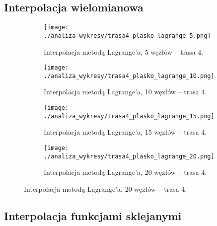 \documentclass[a4paper,12pt]{article}
\begin{document}
\subsection{Interpolacja wielomianowa}
\begin{figure}[H]
    \centering
    \begin{subfigure}{0.45\textwidth}
        \centering
        \texttt{[image: ./analiza\_wykresy/trasa4\_plasko\_lagrange\_5.png]}
        \caption{Interpolacja metodą Lagrange’a, 5 węzłów – trasa 4.}
    \end{subfigure}\hfill
    \begin{subfigure}{0.45\textwidth}
        \centering
        \texttt{[image: ./analiza\_wykresy/trasa4\_plasko\_lagrange\_10.png]}
        \caption{Interpolacja metodą Lagrange’a, 10 węzłów – trasa 4.}
    \end{subfigure}
    
    \vspace{0.5cm}
    
    \begin{subfigure}{0.45\textwidth}
        \centering
        \texttt{[image: ./analiza\_wykresy/trasa4\_plasko\_lagrange\_15.png]}
        \caption{Interpolacja metodą Lagrange’a, 15 węzłów – trasa 4.}
    \end{subfigure}\hfill
    \begin{subfigure}{0.45\textwidth}
        \centering
        \texttt{[image: ./analiza\_wykresy/trasa4\_plasko\_lagrange\_20.png]}
        \caption{Interpolacja metodą Lagrange’a, 20 węzłów – trasa 4.}
    \end{subfigure}
\end{figure}

\subsection{Interpolacja funkcjami sklejanymi}
\end{document}
